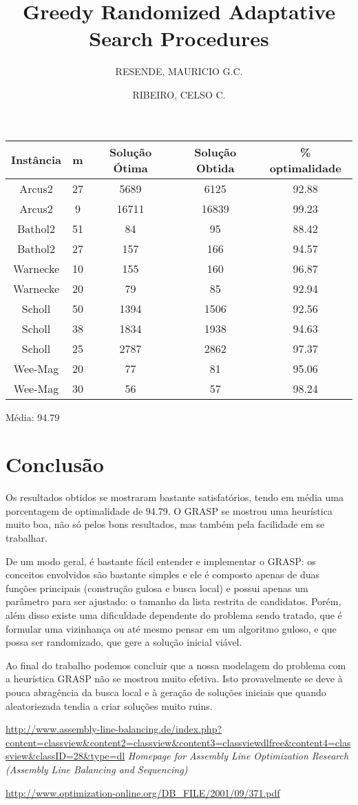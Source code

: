\documentclass{report}
\begin{document}
\begin{table}[htbp]
 \begin{tabular}{|c|c|c|c|c|}
  \hline
  \textbf{Instância} & \textbf{m} & \textbf{Solução Ótima} & \textbf{Solução Obtida} & \% optimalidade \\
  \hline
  Arcus2 & 27 & 5689 & 6125 & 92.88 \\
  \hline
  Arcus2 & 9 & 16711 & 16839 & 99.23 \\
  \hline
  Bathol2 & 51 & 84 & 95 & 88.42 \\
  \hline
  Bathol2 & 27 & 157 & 166 & 94.57 \\
  \hline
  Warnecke & 10 & 155 & 160 & 96.87 \\
  \hline
  Warnecke & 20 & 79 & 85 & 92.94 \\
  \hline
  Scholl & 50 & 1394 & 1506 & 92.56 \\
  \hline
  Scholl & 38 & 1834 & 1938 & 94.63 \\
  \hline
  Scholl & 25 & 2787 & 2862 & 97.37 \\
  \hline
  Wee-Mag & 20 & 77 & 81 & 95.06 \\
  \hline
  Wee-Mag & 30 & 56 & 57 & 98.24 \\
  \hline
 \end{tabular}
\end{table}

Média: 94.79


\chapter{Conclusão}

Os resultados
obtidos se mostraram bastante satisfatórios, tendo em média uma porcentagem de optimalidade de 94.79. O
GRASP se mostrou uma heurística muito boa, não só pelos bons resultados, mas também pela facilidade em se
trabalhar. 

De um modo geral, é bastante fácil entender e implementar o GRASP: os conceitos envolvidos são
bastante simples e ele é composto apenas de duas funções principais (construção gulosa e busca local) e possui
apenas um parâmetro para ser ajustado: o tamanho da lista restrita de candidatos. Porém, além disso existe uma
dificuldade dependente do problema sendo tratado, que é formular uma vizinhança ou até mesmo pensar
em um algoritmo guloso, e que possa ser randomizado, que gere a solução inicial viável.

Ao final do trabalho podemos concluir que a nossa modelagem do problema com a heurística GRASP não se mostrou muito
efetiva. Isto provavelmente se deve à pouca abragência da busca local e à geração de soluções iniciais
que quando aleatoriezada tendia a criar soluções muito ruins.


	\url{http://www.assembly-line-balancing.de/index.php?content=classview&content2=classview&content3=classviewdlfree&content4=classview&classID=28&type=dl}
	\emph{Homepage for Assembly Line Optimization Research (Assembly Line Balancing and Sequencing)}

	\url{http://www.optimization-online.org/DB_FILE/2001/09/371.pdf}
	\author{RESENDE, MAURICIO G.C. \and RIBEIRO, CELSO C.}
	\title{Greedy Randomized Adaptative Search Procedures}
\end{document}
